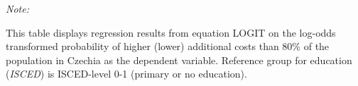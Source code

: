 \begin{table}[htbp!]
\begin{adjustbox}{width = 1\textwidth, max height = 0.95\textheight, center}
\begin{threeparttable}[b]
         \begin{tablenotes}\item \medskip \textit{Note:}
            \item This table displays regression results from equation LOGIT on the log-odds transformed probability of higher (lower) additional costs than 80\% of the population in Czechia as the dependent variable. Reference group for education (\textit{ISCED}) is ISCED-level 0-1 (primary or no education).
         \end{tablenotes}
      \end{threeparttable}
   \end{adjustbox}
\end{table}


